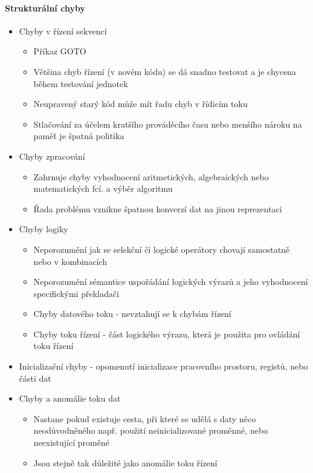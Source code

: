 \paragraph{Strukturální chyby}
\begin{itemize}[itemsep=0px]
\item Chyby v řízení sekvencí
    \begin{itemize}[itemsep=0px]
    \item Příkaz GOTO
    \item Většina chyb řízení (v novém kódu) se dá snadno testovat a je chycena během testování jednotek
    \item Neupravený starý kód může mít řadu chyb v řídicím toku
    \item Stlačování za účelem kratšího prováděcího času nebo menšího nároku na paměť je špatná politika
    \end{itemize}    
\item Chyby zpracování
    \begin{itemize}[itemsep=0px]
    \item Zahrnuje chyby vyhodnocení aritmetických, algebraických nebo matematických fcí. a výběr algoritmu
    \item Řada problému vznikne špatnou konverzí dat na jinou reprezentaci
    \end{itemize}
\item Chyby logiky
    \begin{itemize}[itemsep=0px]
    \item Neporozumění jak se selekční či logické operátory chovají samostatně nebo v kombinacích
    \item Neporozumění sémantice uspořádání logických výrazů a jeho vyhodnocení specifickými překladači
    \item Chyby datového toku - nevztahují se k chybám řízení
    \item Chyby toku řízení - část logického výrazu, která je použita pro ovládání toku řízení
    \end{itemize}
\item Inicializační chyby - opomenutí inicializace pracovního prostoru, registů, nebo části dat
\item Chyby a anomálie toku dat
    \begin{itemize}[itemsep=0px]
    \item Nastane pokud existuje cesta, při které se udělá s daty něco neodůvodněného např. použití neinicializované proměnné, nebo neexistující proměné
    \item Jsou stejně tak důležité jako anomálie toku řízení
    \end{itemize}
\end{itemize}
    
